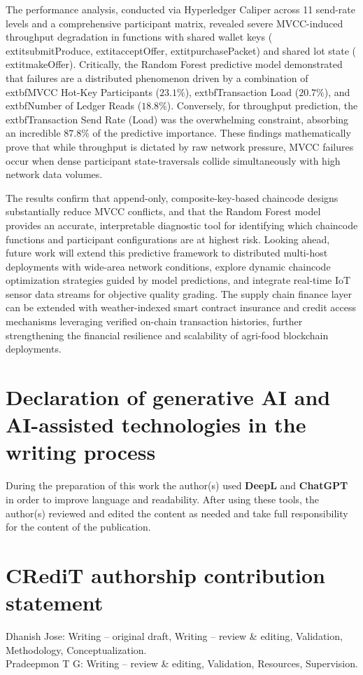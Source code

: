\documentclass[12pt]{article}
\begin{document}
The performance analysis, conducted via Hyperledger Caliper across 11 send-rate levels and a comprehensive participant matrix, revealed severe MVCC-induced throughput degradation in functions with shared wallet keys (	extit{submitProduce}, 	extit{acceptOffer}, 	extit{purchasePacket}) and shared lot state (	extit{makeOffer}). Critically, the Random Forest predictive model demonstrated that failures are a distributed phenomenon driven by a combination of 	extbf{MVCC Hot-Key Participants} ($23.1\%$), 	extbf{Transaction Load} ($20.7\%$), and 	extbf{Number of Ledger Reads} ($18.8\%$). Conversely, for throughput prediction, the 	extbf{Transaction Send Rate (Load)} was the overwhelming constraint, absorbing an incredible $87.8\%$ of the predictive importance. These findings mathematically prove that while throughput is dictated by raw network pressure, MVCC failures occur when dense participant state-traversals collide simultaneously with high network data volumes.

The results confirm that append-only, composite-key-based chaincode designs substantially reduce MVCC conflicts, and that the Random Forest model provides an accurate, interpretable diagnostic tool for identifying which chaincode functions and participant configurations are at highest risk. Looking ahead, future work will extend this predictive framework to distributed multi-host deployments with wide-area network conditions, explore dynamic chaincode optimization strategies guided by model predictions, and integrate real-time IoT sensor data streams for objective quality grading. The supply chain finance layer can be extended with weather-indexed smart contract insurance and credit access mechanisms leveraging verified on-chain transaction histories, further strengthening the financial resilience and scalability of agri-food blockchain deployments.
	
		
	\section*{Declaration of generative AI and AI-assisted technologies in the writing process}
	During the preparation of this work the author(s) used \textbf{DeepL} and \textbf{ChatGPT} in order to improve language and readability. 
	After using these tools, the author(s) reviewed and edited the content as needed and take full responsibility for the content of the publication.
	
	\section*{CRediT authorship contribution statement}
	Dhanish Jose: Writing – original draft, Writing – review \& editing, Validation, Methodology, Conceptualization.\\
	Pradeepmon T G: Writing – review \& editing, Validation, Resources, Supervision.
	
\end{document}
